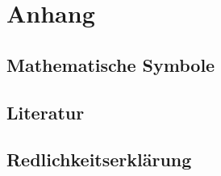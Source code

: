 \chapter{Anhang}
\section{Mathematische Symbole}

\section{Literatur}
\printbibliography

\section{Redlichkeitserklärung}
